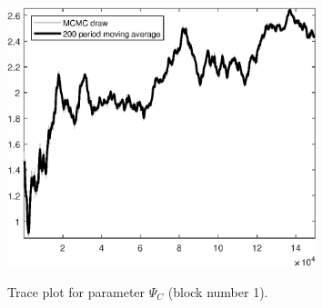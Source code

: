 \begin{figure}[H]
\centering
  \includegraphics[width=0.8\textwidth]{BRS_sectoral_wo_gmf/graphs/TracePlot_Psi_C_blck_1}\\
    \caption{Trace plot for parameter ${\Psi_{C}}$ (block number 1).}
\end{figure}
